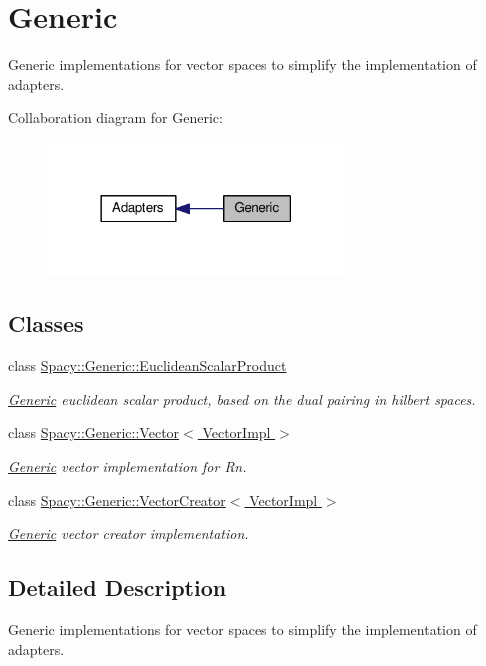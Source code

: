 \hypertarget{group__GenericGroup}{\section{Generic}
\label{group__GenericGroup}
}


Generic implementations for vector spaces to simplify the implementation of adapters.  


Collaboration diagram for Generic\-:
\nopagebreak
\begin{figure}[H]
\begin{center}
\leavevmode
\includegraphics[width=222pt]{group__GenericGroup}
\end{center}
\end{figure}
\subsection*{Classes}
\begin{DoxyCompactItemize}
\item 
class \hyperlink{classSpacy_1_1Generic_1_1EuclideanScalarProduct}{Spacy\-::\-Generic\-::\-Euclidean\-Scalar\-Product}
\begin{DoxyCompactList}\small\item\em \hyperlink{namespaceSpacy_1_1Generic}{Generic} euclidean scalar product, based on the dual pairing in hilbert spaces. \end{DoxyCompactList}\item 
class \hyperlink{classSpacy_1_1Generic_1_1Vector}{Spacy\-::\-Generic\-::\-Vector$<$ Vector\-Impl $>$}
\begin{DoxyCompactList}\small\item\em \hyperlink{namespaceSpacy_1_1Generic}{Generic} vector implementation for Rn. \end{DoxyCompactList}\item 
class \hyperlink{classSpacy_1_1Generic_1_1VectorCreator}{Spacy\-::\-Generic\-::\-Vector\-Creator$<$ Vector\-Impl $>$}
\begin{DoxyCompactList}\small\item\em \hyperlink{namespaceSpacy_1_1Generic}{Generic} vector creator implementation. \end{DoxyCompactList}\end{DoxyCompactItemize}


\subsection{Detailed Description}
Generic implementations for vector spaces to simplify the implementation of adapters. 